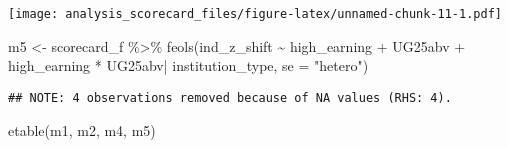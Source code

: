 \documentclass[
]{article}
\newenvironment{Shaded}{\begin{snugshade}}{\end{snugshade}}
\newcommand{\AttributeTok}[1]{\textcolor[rgb]{0.77,0.63,0.00}{#1}}
\newcommand{\FunctionTok}[1]{\textcolor[rgb]{0.00,0.00,0.00}{#1}}
\newcommand{\NormalTok}[1]{#1}
\newcommand{\OtherTok}[1]{\textcolor[rgb]{0.56,0.35,0.01}{#1}}
\newcommand{\SpecialCharTok}[1]{\textcolor[rgb]{0.00,0.00,0.00}{#1}}
\newcommand{\StringTok}[1]{\textcolor[rgb]{0.31,0.60,0.02}{#1}}
\begin{document}
\texttt{[image: analysis\_scorecard\_files/figure-latex/unnamed-chunk-11-1.pdf]}

\begin{Shaded}
\begin{Highlighting}[]
\NormalTok{m5 }\OtherTok{\textless{}{-}}\NormalTok{ scorecard\_f }\SpecialCharTok{\%\textgreater{}\%} \FunctionTok{feols}\NormalTok{(ind\_z\_shift }\SpecialCharTok{\textasciitilde{}}\NormalTok{ high\_earning }\SpecialCharTok{+}\NormalTok{ UG25abv }\SpecialCharTok{+}\NormalTok{ high\_earning }\SpecialCharTok{*}\NormalTok{ UG25abv}\SpecialCharTok{|}\NormalTok{ institution\_type, }\AttributeTok{se =} \StringTok{"hetero"}\NormalTok{)}
\end{Highlighting}
\end{Shaded}

\begin{verbatim}
## NOTE: 4 observations removed because of NA values (RHS: 4).
\end{verbatim}

\begin{Shaded}
\begin{Highlighting}[]
\FunctionTok{etable}\NormalTok{(m1, m2, m4, m5)}
\end{Highlighting}
\end{Shaded}
\end{document}
